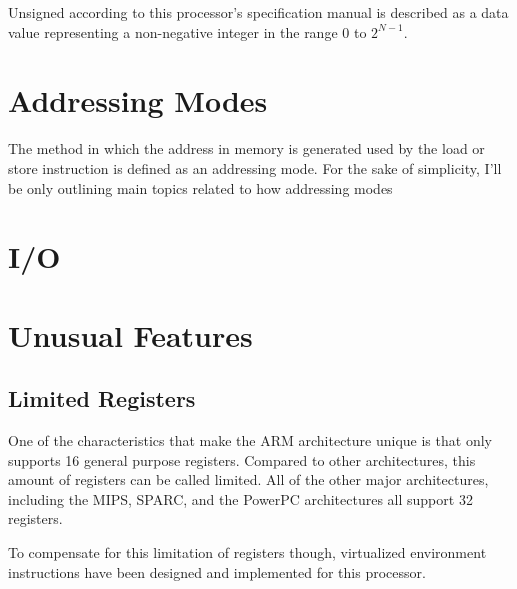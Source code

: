 \documentclass[12pt]{scrreprt}
\begin{document}
	Unsigned according to this processor's specification manual is described as a data value representing a non-negative integer in the
	range $0$ to $2^{N-1}$.

{\let\clearpage\relax\chapter{Addressing Modes}}

	The method in which the address in memory is generated used by the load or store instruction is defined as an addressing mode.
	For the sake of simplicity, I'll be only outlining main topics related to how addressing modes


{\let\clearpage\relax\chapter{I/O}}

{\let\clearpage\relax\chapter{Unusual Features}}
	
	\section{Limited Registers}

	One of the characteristics that make the ARM architecture unique is that only supports 16 general purpose registers. Compared to other architectures, this amount of registers can be called limited. All of the other major architectures, including the MIPS, SPARC, and the PowerPC architectures all support 32 registers. \iffalse Find a way to say how Itanium has 128 registers. the Itanium RISC architecture supports 128 registers! \fi

	To compensate for this limitation of registers though, virtualized environment instructions have been designed and implemented for this 
	processor.
\end{document}
